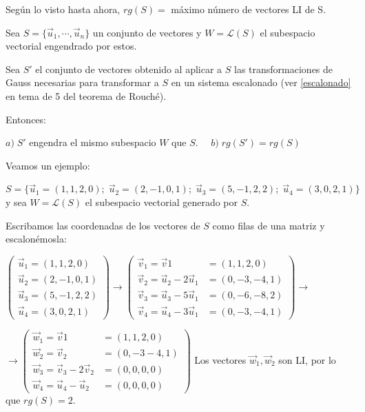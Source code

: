 Según lo visto hasta ahora, $rg(S)=$ máximo número de vectores LI de S.

\begin{teor}

Sea  $S=\{ \vec u_1, \cdots , \vec u_n \}$ un conjunto de vectores y $W=\mathcal L(S)$ el subespacio vectorial engendrado por estos.

Sea $S'$ el conjunto de vectores obtenido al aplicar a $S$ las transformaciones de Gauss necesarias para transformar a $S$ en un sistema escalonado (ver \ref{escalonado} en tema de  5 del teorema de Rouché).

Entonces:


$a)\; S'$ engendra el mismo subespacio $W$ que $S$.
$\quad b)\; rg(S')=rg(S)$	


\end{teor}

Veamos un ejemplo:

\noindent \small{$S=\{\vec u_1=(1,1,2,0); \; \vec u_2=(2,-1,0,1); \; \vec u_3=(5,-1,2,2); \; \vec u_4=(3,0,2,1) \}$} \normalsize{ y} sea $W=\mathcal L(S)$ el subespacio vectorial generado por $S$.

\noindent Escribamos las coordenadas de los vectores de $S$ como filas de una matriz y escalonémosla:

\noindent $\left (\begin{matrix}  \vec u_1=(1,1,2,0) \\ \vec u_2=(2,-1,0,1) \\ \vec u_3=(5,-1,2,2) \\ \vec u_4=(3,0,2,1) \end{matrix} \right) \to \left (\begin{matrix} \vec v_1= \vec v1 &= (1,1,2,0) \\ \vec v_2=\vec u_2-2\vec u_1 &=(0,-3,-4,1) \\ \vec v_3=\vec u_3-5\vec u_1 &=(0,-6,-8,2) \\ \vec v_4=\vec u_4-3\vec u_1 &=(0,-3,-4,1)    \end{matrix} \right) \to $

\noindent $\to \left (\begin{matrix} \vec w_1=\vec v1 &=(1,1,2,0) \\ \vec w_2=\vec v_2 &=(0,-3-4,1) \\ \vec w_3=\vec v_3-2\vec v_2 &=(0,0,0,0) \\ \vec w_4=\vec u_4-\vec u_2 &=(0,0,0,0) \end{matrix} \right)$ Los vectores $\vec w_1, \vec w_2$ son LI, por lo que $rg(S)=2$.

